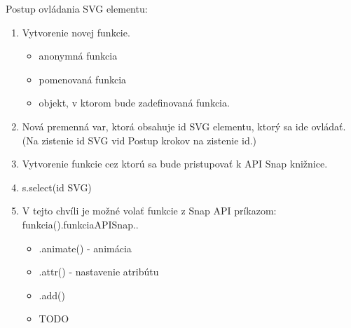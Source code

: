 Postup ovládania SVG elementu:

\begin{enumerate}
	\item Vytvorenie novej funkcie. 
	\begin{itemize}
		\item anonymná funkcia 
		\item pomenovaná funkcia
		\item objekt, v ktorom bude zadefinovaná funkcia. 
	\end{itemize}
	\item Nová premenná var, ktorá obsahuje id SVG elementu, ktorý sa ide ovládať. (Na zistenie id SVG vid Postup krokov na zistenie id.)
	\item Vytvorenie funkcie cez ktorú sa bude pristupovať k API Snap knižnice. 
	\item s.select(id SVG)
	\item V tejto chvíli je možné volať funkcie z Snap API príkazom: funkcia().funkciaAPISnap.. 
	\begin{itemize}
		\item .animate() - animácia
		\item .attr() - nastavenie atribútu
		\item .add() 
		\item TODO
		\
	\end{itemize}
	
	
	
\end{enumerate}

